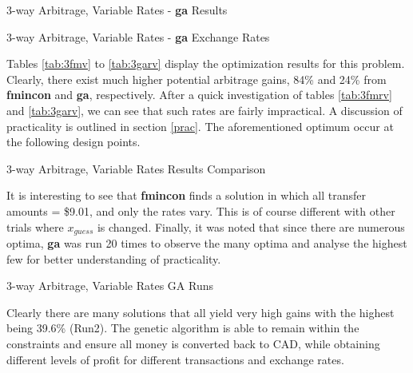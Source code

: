 \documentclass[12pt]{article}
\begin{document}
\begin{table}[H]
    \centering
    
    \caption{3-way Arbitrage, Variable Rates - \textbf{ga} Results}
    \label{tab:3gav}
\end{table}

\begin{table}[H]
    \centering
    
    \caption{3-way Arbitrage, Variable Rates - \textbf{ga} Exchange Rates}
    \label{tab:3garv}
\end{table}
Tables \ref{tab:3fmv} to \ref{tab:3garv} display the optimization results for this problem. Clearly, there exist much higher potential arbitrage gains, 84\% and 24\% from \textbf{fmincon} and \textbf{ga}, respectively. After a quick investigation of tables \ref{tab:3fmrv} and \ref{tab:3garv}, we can see that such rates are fairly impractical. A discussion of practicality is outlined in section \ref{prac}. The aforementioned optimum occur at the following design points.
\begin{table}[H]
    \centering
    
    \caption{3-way Arbitrage, Variable Rates Results Comparison}
    \label{tab:3resv}
\end{table}
It is interesting to see that \textbf{fmincon} finds a solution in which all transfer amounts = \$9.01, and only the rates vary. This is of course different with other trials where $x_{guess}$ is changed. Finally, it was noted that since there are numerous optima, \textbf{ga} was run 20 times to observe the many optima and analyse the highest few for better understanding of practicality.
\begin{table}[H]
    \centering
    
    \caption{3-way Arbitrage, Variable Rates GA Runs}
    \label{tab:gaTrials}
\end{table}
Clearly there are many solutions that all yield very high gains with the highest being 39.6\% (Run2). The genetic algorithm is able to remain within the constraints and ensure all money is converted back to CAD, while obtaining different levels of profit for different transactions and exchange rates.
\end{document}
